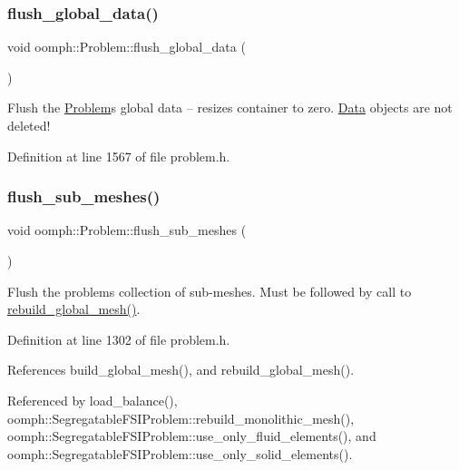 \subsubsection{\texorpdfstring{flush\+\_\+global\+\_\+data()}{flush\_global\_data()}}
{\footnotesize\ttfamily void oomph\+::\+Problem\+::flush\+\_\+global\+\_\+data (\begin{DoxyParamCaption}{ }\end{DoxyParamCaption})\hspace{0.3cm}{\ttfamily [inline]}}



Flush the \hyperlink{classoomph_1_1Problem}{Problem}\textquotesingle{}s global data -- resizes container to zero. \hyperlink{classoomph_1_1Data}{Data} objects are not deleted! 



Definition at line 1567 of file problem.\+h.

\mbox{\label{classoomph_1_1Problem_a42b2b42a03f9de7d7a4d24edcfa20179}} 
\subsubsection{\texorpdfstring{flush\+\_\+sub\+\_\+meshes()}{flush\_sub\_meshes()}}
{\footnotesize\ttfamily void oomph\+::\+Problem\+::flush\+\_\+sub\+\_\+meshes (\begin{DoxyParamCaption}{ }\end{DoxyParamCaption})\hspace{0.3cm}{\ttfamily [inline]}}



Flush the problem\textquotesingle{}s collection of sub-\/meshes. Must be followed by call to \hyperlink{classoomph_1_1Problem_ac0a0e649f36b4a7ce992888c323d1571}{rebuild\+\_\+global\+\_\+mesh()}. 



Definition at line 1302 of file problem.\+h.



References build\+\_\+global\+\_\+mesh(), and rebuild\+\_\+global\+\_\+mesh().



Referenced by load\+\_\+balance(), oomph\+::\+Segregatable\+F\+S\+I\+Problem\+::rebuild\+\_\+monolithic\+\_\+mesh(), oomph\+::\+Segregatable\+F\+S\+I\+Problem\+::use\+\_\+only\+\_\+fluid\+\_\+elements(), and oomph\+::\+Segregatable\+F\+S\+I\+Problem\+::use\+\_\+only\+\_\+solid\+\_\+elements().

